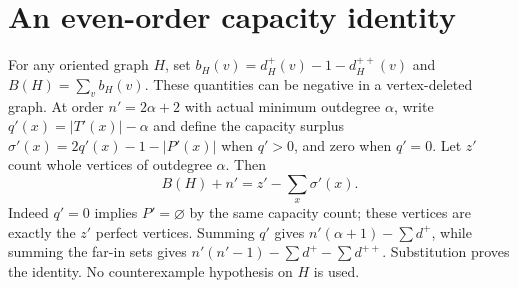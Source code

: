 \section{An even-order capacity identity}
For any oriented graph $H$, set
$b_H(v)=d_H^+(v)-1-d_H^{++}(v)$ and $B(H)=\sum_v b_H(v)$.
These quantities can be negative in a vertex-deleted graph.
At order $n'=2\alpha+2$ with actual minimum outdegree $\alpha$,
write $q'(x)=|T'(x)|-\alpha$ and define the capacity surplus
$\sigma'(x)=2q'(x)-1-|P'(x)|$ when $q'>0$, and zero when $q'=0$.
Let $z'$ count whole vertices of outdegree $\alpha$.
Then
\[
 B(H)+n'=z'-\sum_x\sigma'(x).
\]
Indeed $q'=0$ implies $P'=\varnothing$ by the same capacity count;
these vertices are exactly the $z'$ perfect vertices. Summing
$q'$ gives $n'(\alpha+1)-\sum d^+$, while summing the far-in sets
gives $n'(n'-1)-\sum d^+-\sum d^{++}$. Substitution proves the identity.
No counterexample hypothesis on $H$ is used.
